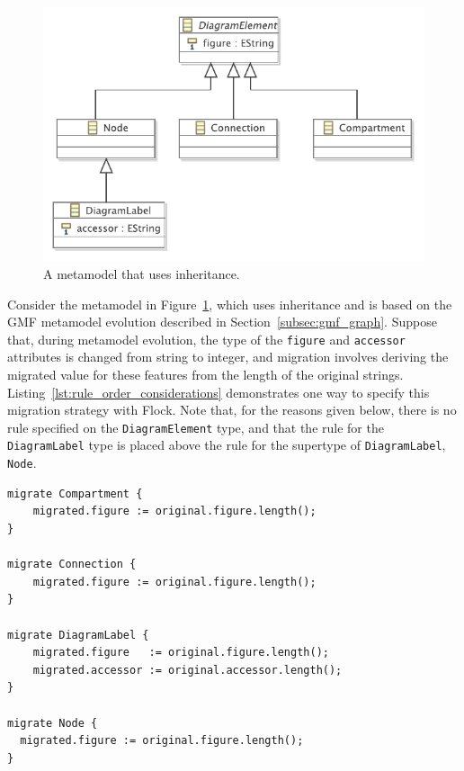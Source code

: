 \begin{figure}[htbp]
  \centering
  \includegraphics[scale=0.75]{6.Evaluation/images/subtyping.pdf}
  \caption{A metamodel that uses inheritance.}
  \label{fig:inheritance}
\end{figure}

Consider the metamodel in Figure~\ref{fig:inheritance}, which uses inheritance and is based on the GMF metamodel evolution described in Section~\ref{subsec:gmf_graph}. Suppose that, during metamodel evolution, the type of the \texttt{fi\-gu\-re} and \texttt{ac\-ce\-ss\-or} attributes is changed from string to integer, and migration involves deriving the migrated value for these features from the length of the original strings. Listing~\ref{lst:rule_order_considerations} demonstrates one way to specify this migration strategy with Flock. Note that, for the reasons given below, there is no rule specified on the \texttt{Di\-ag\-r\-amEl\-em\-e\-nt} type, and that the rule for the \texttt{Di\-ag\-r\-amLa\-b\-el} type is placed above the rule for the supertype of \texttt{Di\-ag\-r\-amLa\-b\-el}, \texttt{No\-de}.

\begin{lstlisting}[float=tbp, caption=A migration strategy for the metamodel evolution described in Figure~\ref{fig:inheritance}, label=lst:rule_order_considerations, language=Flock, tabsize=2]
migrate Compartment {
	migrated.figure := original.figure.length();
}

migrate Connection {
	migrated.figure := original.figure.length();
}

migrate DiagramLabel {
	migrated.figure   := original.figure.length();
	migrated.accessor := original.accessor.length();
}

migrate Node {
  migrated.figure := original.figure.length();
}
\end{lstlisting}

